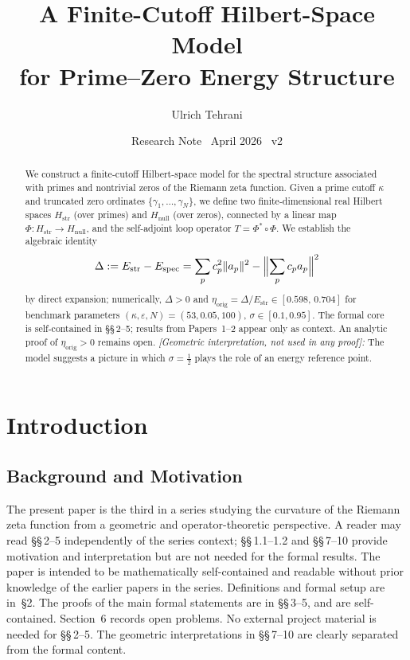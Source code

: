 \documentclass[11pt]{article}
\title{\vspace{-1.5em}\bfseries A Finite-Cutoff Hilbert-Space Model\\[0.4em]
\large for Prime--Zero Energy Structure}
\author{Ulrich Tehrani}
\date{Research Note \textperiodcentered\ April 2026 \textperiodcentered\ v2}
\newcommand{\Hstr}{H_{\mathrm{str}}}
\newcommand{\Hnull}{H_{\mathrm{null}}}
\newcommand{\Estr}{E_{\mathrm{str}}}
\newcommand{\Espec}{E_{\mathrm{spec}}}
\newcommand{\etaorig}{\eta_{\mathrm{orig}}}
\begin{document}
\maketitle

\begin{abstract}
We construct a finite-cutoff Hilbert-space model for the spectral structure
associated with primes and nontrivial zeros of the Riemann zeta function.
Given a prime cutoff $\kappa$ and truncated zero ordinates
$\{\gamma_1,\ldots,\gamma_N\}$, we define two finite-dimensional real
Hilbert spaces $\Hstr$ (over primes) and $\Hnull$ (over zeros),
connected by a linear map $\Phi\colon\Hstr\to\Hnull$, and the
self-adjoint loop operator $T = \Phi^*\circ\Phi$.
We establish the algebraic identity
\[
\Delta := \Estr - \Espec
 = \sum_p c_p^2\|a_p\|^2 - \Bigl\|\sum_p c_p a_p\Bigr\|^2
\]
by direct expansion; numerically, $\Delta > 0$ and
$\etaorig = \Delta/\Estr \in [0.598,\,0.704]$ for benchmark parameters
$(\kappa,\varepsilon,N)=(53,0.05,100)$, $\sigma\in[0.1,0.95]$.
The formal core is self-contained in \S\S\,2--5;
results from Papers~1--2 appear only as context.
An analytic proof of $\etaorig>0$ remains open.
\emph{[Geometric interpretation, not used in any proof]:}
The model suggests a picture in which $\sigma=\tfrac12$ plays
the role of an energy reference point.
\end{abstract}

\tableofcontents
\newpage

\section{Introduction}

\subsection{Background and Motivation}

The present paper is the third in a series studying the curvature of the
Riemann zeta function from a geometric and operator-theoretic perspective.
A reader may read \S\S\,2--5 independently of the series context;
\S\S\,1.1--1.2 and \S\S\,7--10 provide motivation and interpretation
but are not needed for the formal results.
The paper is intended to be mathematically self-contained and readable
without prior knowledge of the earlier papers in the series.
Definitions and formal setup are in~\S2.
The proofs of the main formal statements are in \S\S\,3--5, and are
self-contained. Section~6 records open problems.
No external project material is needed for \S\S\,2--5.
The geometric interpretations in \S\S\,7--10 are clearly separated from
the formal content.
\end{document}
